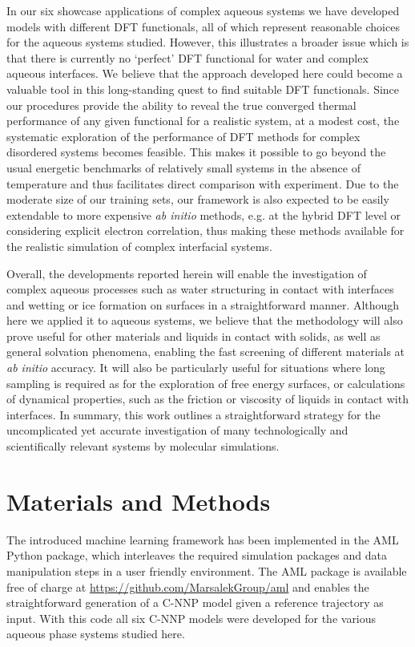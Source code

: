 \documentclass[aip,jcp,amsmath,amssymb,floatfix,reprint,citeautoscript,noeprint]{revtex4-1}
\begin{document}
\begin{bibunit}
In our six showcase applications of complex aqueous systems we have developed models with different DFT functionals, all of which represent reasonable choices for the aqueous systems studied.
% 
However, this illustrates a broader issue which is that there is currently no `perfect' DFT functional for water and complex aqueous interfaces.
%
We believe that the approach developed here could become a valuable tool in this long-standing quest to find suitable DFT functionals.
%
Since our procedures provide the ability to reveal the true converged thermal performance of any
given functional for a realistic system, at a modest cost, the systematic exploration of the performance of DFT methods for complex disordered systems becomes feasible.
%
This makes it possible to go beyond the usual energetic benchmarks of relatively small systems in the absence of temperature and thus facilitates direct comparison with experiment.
%
Due to the moderate size of our training sets, our framework is also expected to be
easily extendable to more expensive \textit{ab initio} methods, e.g. at the hybrid DFT level
or considering explicit electron correlation, thus making these methods available for the realistic simulation of complex interfacial systems.

Overall, the developments reported herein will enable
the investigation of complex aqueous processes
such as water structuring in contact with interfaces and
wetting or ice formation on surfaces in a straightforward
manner.
%
Although here we applied it to aqueous systems, we believe
that the methodology will also prove useful for
other materials and liquids in contact with solids, as well as
general solvation phenomena, enabling the fast
screening of different materials at \textit{ab initio} accuracy.
%
It will also be particularly useful for situations where long sampling is required as for the exploration of free energy surfaces, or calculations of dynamical properties, such as the friction or viscosity of liquids in contact with interfaces.
%
In summary, this work outlines a straightforward strategy for the uncomplicated yet accurate investigation of many technologically and scientifically relevant systems by molecular simulations.



%
%
%
%
%
%
%
%
%


%
%
%
%
%
%
%
\section*{Materials and Methods}
\label{sec:methods}
%
%
The introduced machine learning framework has been
implemented in the AML Python package, which
interleaves the required simulation packages
and data manipulation steps in a user friendly
environment.
%
The AML package is available free of charge at \url{https://github.com/MarsalekGroup/aml}
and enables the straightforward generation of
a C-NNP model given a reference
trajectory as input.
%
With this code all six C-NNP models were developed
for the various aqueous phase systems studied here.


\end{bibunit}
\end{document}
